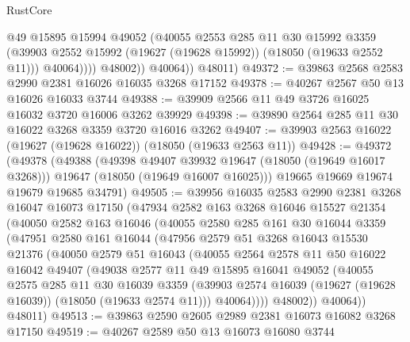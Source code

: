 \begin{lexlean}{RustCore}
\begin{coremodule}
                    @49
                    @15895
                    @15994
                    @49052
                    (@40055
                      @2553
                      @285
                      @11
                      @30
                      @15992
                      @3359
                      (@39903 @2552 @15992 (@19627 (@19628 @15992)) (@18050 (@19633 @2552 @11)))
                      @40064))))
              @48002))
          @40064))
      @48011)
@49372 := @39863 @2568 @2583 @2990 @2381 @16026 @16035 @3268 @17152
@49378 := @40267 @2567 @50 @13 @16026 @16033 @3744
@49388 := @39909 @2566 @11 @49 @3726 @16025 @16032 @3720 @16006 @3262 @39929
@49398 := @39890 @2564 @285 @11 @30 @16022 @3268 @3359 @3720 @16016 @3262
@49407 := @39903 @2563 @16022 (@19627 (@19628 @16022)) (@18050 (@19633 @2563 @11))
@49428 := @49372
    (@49378
      (@49388
        (@49398 @49407 @39932 @19647 (@18050 (@19649 @16017 @3268)))
        @19647
        (@18050 (@19649 @16007 @16025)))
      @19665
      @19669
      @19674
      @19679
      @19685
      @34791)
@49505 := @39956
    @16035
    @2583
    @2990
    @2381
    @3268
    @16047
    @16073
    @17150
    (@47934
      @2582
      @163
      @3268
      @16046
      @15527
      @21354
      (@40050
        @2582
        @163
        @16046
        (@40055
          @2580
          @285
          @161
          @30
          @16044
          @3359
          (@47951
            @2580
            @161
            @16044
            (@47956
              @2579
              @51
              @3268
              @16043
              @15530
              @21376
              (@40050
                @2579
                @51
                @16043
                (@40055
                  @2564
                  @2578
                  @11
                  @50
                  @16022
                  @16042
                  @49407
                  (@49038
                    @2577
                    @11
                    @49
                    @15895
                    @16041
                    @49052
                    (@40055
                      @2575
                      @285
                      @11
                      @30
                      @16039
                      @3359
                      (@39903 @2574 @16039 (@19627 (@19628 @16039)) (@18050 (@19633 @2574 @11)))
                      @40064))))
              @48002))
          @40064))
      @48011)
@49513 := @39863 @2590 @2605 @2989 @2381 @16073 @16082 @3268 @17150
@49519 := @40267 @2589 @50 @13 @16073 @16080 @3744

\end{coremodule}
\end{lexlean}
